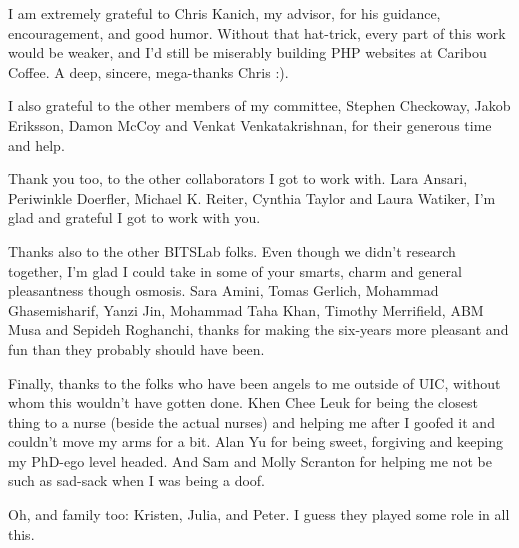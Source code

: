 \acknowledgment
I am extremely grateful to Chris Kanich, my advisor, for his guidance,
encouragement, and good humor.  Without that hat-trick, every part of this
work would be weaker, and I'd still be miserably building PHP websites
at Caribou Coffee.  A deep, sincere, mega-thanks Chris :).

I also grateful to the other members of my committee, Stephen Checkoway,
Jakob Eriksson, Damon McCoy and Venkat Venkatakrishnan, for their generous
time and help.

Thank you too, to the other collaborators I got to work with. Lara Ansari,
Periwinkle Doerfler, Michael K. Reiter, Cynthia Taylor and Laura Watiker,
I'm glad and grateful I got to work with you.

Thanks also to the other BITSLab folks.  Even though we didn't research
together, I'm glad I could take in some of your smarts, charm and general
pleasantness though osmosis. Sara Amini, Tomas Gerlich, Mohammad Ghasemisharif,
Yanzi Jin, Mohammad Taha Khan, Timothy Merrifield, ABM Musa and Sepideh
Roghanchi, thanks for making the six-years more pleasant and fun than they
probably should have been.

Finally, thanks to the folks who have been angels to me outside of UIC, without
whom this wouldn't have gotten done. Khen Chee Leuk for being the closest thing
to a nurse (beside the actual nurses) and helping me after I goofed it
and couldn't move my arms for a bit.  Alan Yu for being sweet,
forgiving and keeping my PhD-ego level headed.  And Sam and
Molly Scranton for helping me not be such as sad-sack when I was being a doof.

Oh, and family too: Kristen, Julia, and Peter.  I guess they played some
role in all this.
